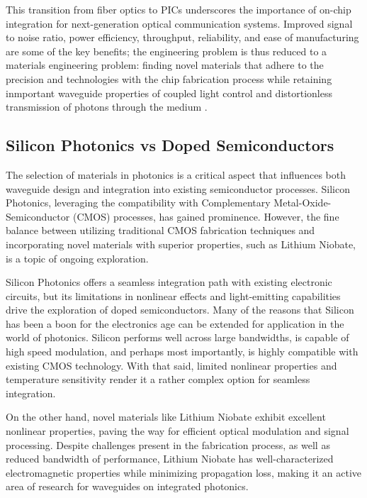 \documentclass[10pt]{article}
\begin{document}
This transition from fiber optics to PICs underscores the importance of on-chip integration for next-generation optical communication systems. Improved signal to noise ratio, power efficiency, throughput, reliability, and ease of manufacturing are some of the key benefits; the engineering problem is thus reduced to a 
materials engineering problem: finding novel materials that adhere to the precision and technologies with the chip fabrication process while retaining inmportant waveguide 
properties of coupled light control and distortionless transmission of photons through the medium \cite{ref02}.

\subsection{Silicon Photonics vs Doped Semiconductors}

The selection of materials in photonics is a critical aspect that influences both waveguide design and integration into existing semiconductor processes. 
Silicon Photonics, leveraging the compatibility with Complementary Metal-Oxide-Semiconductor (CMOS) processes, has gained prominence. However, the fine balance between utilizing traditional CMOS fabrication techniques and incorporating novel materials with superior properties, such as Lithium Niobate, is a topic of ongoing exploration.

Silicon Photonics offers a seamless integration path with existing electronic circuits, but its limitations in nonlinear effects and light-emitting capabilities drive the exploration of doped semiconductors. Many of the 
reasons that Silicon has been a boon for the electronics age can be extended for application in the world of photonics. Silicon performs well across large bandwidths, is capable of high speed modulation, and perhaps most importantly, is highly compatible with existing CMOS technology.
With that said, limited nonlinear properties and temperature sensitivity render it a rather complex option for seamless integration.

On the other hand, novel materials like Lithium Niobate exhibit excellent nonlinear properties, paving the way for efficient optical modulation and signal processing. Despite 
challenges present in the fabrication process, as well as reduced bandwidth of performance, Lithium Niobate has well-characterized electromagnetic properties while minimizing propagation loss, 
making it an active area of research for waveguides on integrated photonics.
\end{document}
